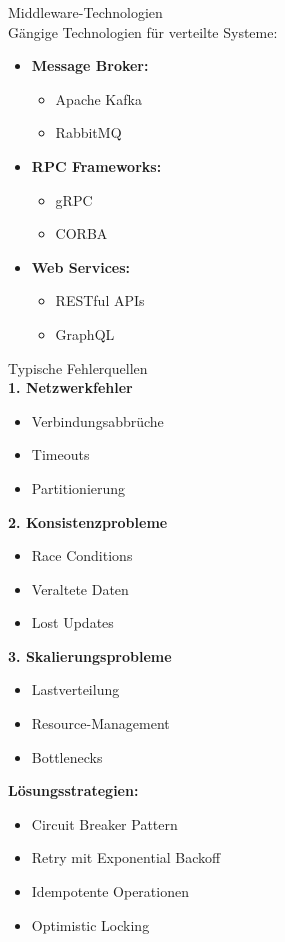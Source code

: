 \begin{concept}{Middleware-Technologien}\\
Gängige Technologien für verteilte Systeme:
\begin{itemize}
    \item \textbf{Message Broker:} 
    \begin{itemize}
        \item Apache Kafka
        \item RabbitMQ
    \end{itemize}
    \item \textbf{RPC Frameworks:}
    \begin{itemize}
        \item gRPC
        \item CORBA
    \end{itemize}
    \item \textbf{Web Services:}
    \begin{itemize}
        \item RESTful APIs
        \item GraphQL
    \end{itemize}
\end{itemize}
\end{concept}



\begin{KR}{Typische Fehlerquellen}\\
\textbf{1. Netzwerkfehler}
\begin{itemize}
    \item Verbindungsabbrüche
    \item Timeouts
    \item Partitionierung
\end{itemize}

\textbf{2. Konsistenzprobleme}
\begin{itemize}
    \item Race Conditions
    \item Veraltete Daten
    \item Lost Updates
\end{itemize}

\textbf{3. Skalierungsprobleme}
\begin{itemize}
    \item Lastverteilung
    \item Resource-Management
    \item Bottlenecks
\end{itemize}

\textbf{Lösungsstrategien:}
\begin{itemize}
    \item Circuit Breaker Pattern
    \item Retry mit Exponential Backoff
    \item Idempotente Operationen
    \item Optimistic Locking
\end{itemize}
\end{KR}


